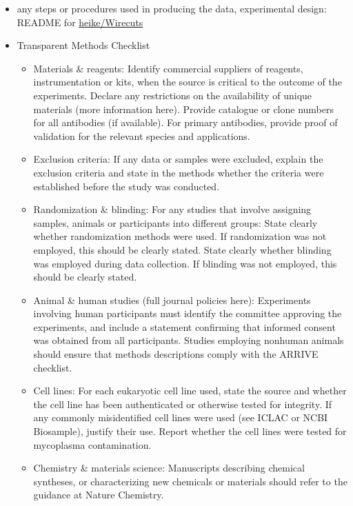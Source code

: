 \documentclass[fleqn,10pt]{wlscirep}
\begin{document}
\begin{itemize}
  \item
  any steps or procedures used in producing the data, experimental design: README for \href{https://github.com/heike/Wirecuts}{heike/Wirecuts}
  
  \item
  Transparent Methods Checklist
  \begin{itemize}
    \item
    Materials \& reagents:
    Identify commercial suppliers of reagents, instrumentation or kits, when the source is critical to the outcome of the experiments.
    Declare any restrictions on the availability of unique materials (more information here).
    Provide catalogue or clone numbers for all antibodies (if available). For primary antibodies, provide proof of validation for the relevant species and applications.
    
    \item
    Exclusion criteria: If any data or samples were excluded, explain the exclusion criteria and state in the methods whether the criteria were established before the study was conducted.
    
    \item
    Randomization \& blinding: For any studies that involve assigning samples, animals or participants into different groups:
    State clearly whether randomization methods were used. If randomization was not employed, this should be clearly stated.
    State clearly whether blinding was employed during data collection. If blinding was not employed, this should be clearly stated.
    
    \item
    Animal \& human studies (full journal policies here):
    Experiments involving human participants must identify the committee approving the experiments, and include a statement confirming that informed consent was obtained from all participants.
    Studies employing nonhuman animals should ensure that methods descriptions comply with the ARRIVE checklist.
    
    \item
    Cell lines:
    For each eukaryotic cell line used, state the source and whether the cell line has been authenticated or otherwise tested for integrity.
    If any commonly misidentified cell lines were used (see ICLAC or NCBI Biosample), justify their use.
    Report whether the cell lines were tested for mycoplasma contamination.
    
    \item
    Chemistry \& materials science: Manuscripts describing chemical syntheses, or characterizing new chemicals or materials should refer to the guidance at Nature Chemistry.
    
    \end{itemize}
    
\end{itemize}
\end{document}
